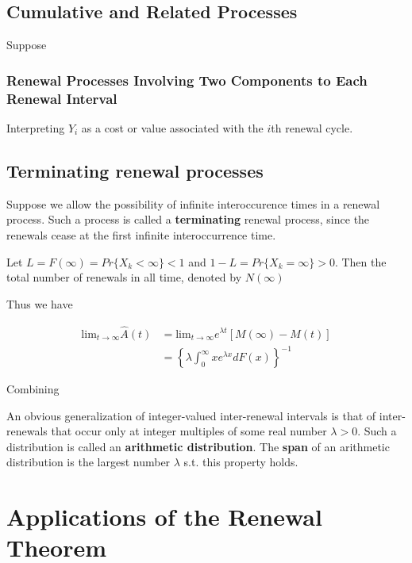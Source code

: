 \documentclass[12pt]{article}
\theoremstyle{nonumberbreak}
\begin{document}
\subsection{Cumulative and Related Processes}

Suppose 

\subsubsection{Renewal Processes Involving Two Components to Each Renewal Interval}

Interpreting $Y_i$ as a cost or value associated with the $i$th renewal cycle. 



\subsection{Terminating renewal processes}

Suppose we allow the possibility of infinite interoccurence times in a renewal process. Such a process is called a \textbf{terminating} renewal process, since the renewals cease at the first infinite interoccurrence time.

Let $L = F(\infty) = Pr \{ X_k < \infty \} < 1$ and $1 - L = Pr \{ X_k = \infty \} > 0$. Then the total number of renewals in all time, denoted by $N(\infty)$



Thus we have

$$
\begin{aligned}
\mathrm{lim}_{t\to\infty} \hat{A}(t) &= \mathrm{lim}_{t\to\infty} e^{\lambda t} [M(\infty) - M(t) ] \\[8pt]
&= \left\{ \lambda \int_0^\infty x e^{\lambda x} dF(x) \right\}^{-1}
\end{aligned}
$$



Combining 



An obvious generalization of integer-valued inter-renewal intervals is that of inter-renewals that occur only at integer multiples of some real number $\lambda >0$. Such a distribution is called an \textbf{arithmetic distribution}. The \textbf{span} of an arithmetic distribution is the largest number $\lambda$ s.t. this property holds. 






\section{Applications of the Renewal Theorem}
\end{document}
